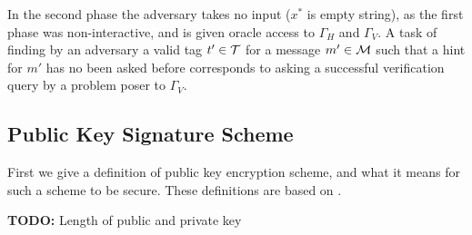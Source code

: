 In the second phase the adversary takes no input ($x^*$ is empty string), as the first phase was non-interactive, and
is given oracle access to $\Gamma_H$ and $\Gamma_V$.
A task of finding by an adversary a valid tag $t' \in \mathcal{T}$ for a message $m' \in \mathcal{M}$ such that a hint for $m'$ has no been asked before
corresponds to asking a successful verification query by a problem poser to $\Gamma_V$.
%
\subsection{Public Key Signature Scheme}
First we give a definition of public key encryption scheme, and what it means for such a scheme to be secure.
These definitions are based on \cite{Goldreich:2004:FCV:975541}.

\begin{todo}
  \textbf{TODO:} Length of public and private key
\end{todo}

